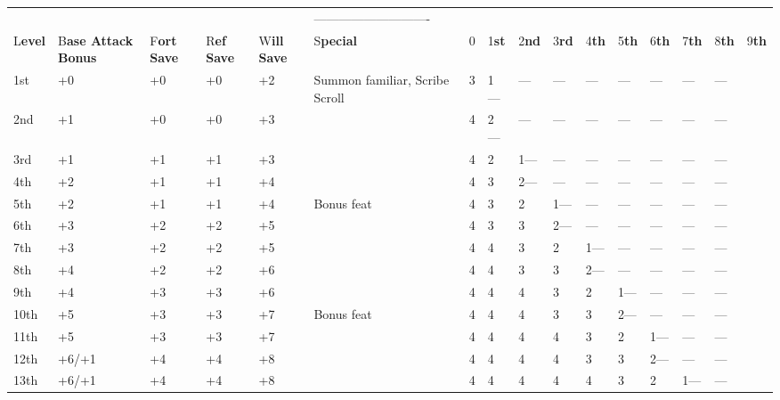 \documentclass{article}
\begin{document}
\vspace{12pt}
\begin{tabular}{|>{\raggedright}p{15pt}|>{\raggedright}p{25pt}|>{\raggedright}p{11pt}|>{\raggedright}p{10pt}|>{\raggedright}p{11pt}|>{\raggedright}p{19pt}|>{\raggedright}p{3pt}|>{\raggedright}p{7pt}|>{\raggedright}p{6pt}|>{\raggedright}p{6pt}|>{\raggedright}p{6pt}|>{\raggedright}p{6pt}|>{\raggedright}p{6pt}|>{\raggedright}p{6pt}|>{\raggedright}p{6pt}|>{\raggedright}p{6pt}|}
\hline
\multicolumn{16}{|p{158pt}|}{T\textbf{able: The Wizard}}\tabularnewline
\hline
 &  &  &  &  & ---------------------------- & \multicolumn{10}{p{64pt}|}{ \textbf{Spells 
per Day -------------------------}}\tabularnewline
\hline
L\textbf{evel} & B\textbf{ase Attack }\linebreak{}
\textbf{Bonus} & F\textbf{ort }\linebreak{}
\textbf{Save} & R\textbf{ef }\linebreak{}
\textbf{Save} & W\textbf{ill }\linebreak{}
\textbf{Save} & S\textbf{pecial} & 0 & 1\textbf{st} & 2\textbf{nd} & 3\textbf{rd} & 4\textbf{th} & 5\textbf{th} & 6\textbf{th} & 7\textbf{th} & 8\textbf{th} & 9\textbf{th}\tabularnewline
\hline
1st & +0 & +0 & +0 & +2 & Summon familiar, \linebreak{}
Scribe Scroll & 3 & 1--- & --- & --- & --- & --- & --- & --- & --- & \tabularnewline
\hline
2nd & +1 & +0 & +0 & +3 &  & 4 & 2--- & --- & --- & --- & --- & --- & --- & --- & \tabularnewline
\hline
3rd & +1 & +1 & +1 & +3 &  & 4 & 2 & 1--- & --- & --- & --- & --- & --- & --- & \tabularnewline
\hline
4th & +2 & +1 & +1 & +4 &  & 4 & 3 & 2--- & --- & --- & --- & --- & --- & --- & \tabularnewline
\hline
5th & +2 & +1 & +1 & +4 & Bonus feat & 4 & 3 & 2 & 1--- & --- & --- & --- & --- & --- & \tabularnewline
\hline
6th & +3 & +2 & +2 & +5 &  & 4 & 3 & 3 & 2--- & --- & --- & --- & --- & --- & \tabularnewline
\hline
7th & +3 & +2 & +2 & +5 &  & 4 & 4 & 3 & 2 & 1--- & --- & --- & --- & --- & \tabularnewline
\hline
8th & +4 & +2 & +2 & +6 &  & 4 & 4 & 3 & 3 & 2--- & --- & --- & --- & --- & \tabularnewline
\hline
9th & +4 & +3 & +3 & +6 &  & 4 & 4 & 4 & 3 & 2 & 1--- & --- & --- & --- & \tabularnewline
\hline
10th & +5 & +3 & +3 & +7 & Bonus feat & 4 & 4 & 4 & 3 & 3 & 2--- & --- & --- & --- & \tabularnewline
\hline
11th & +5 & +3 & +3 & +7 &  & 4 & 4 & 4 & 4 & 3 & 2 & 1--- & --- & --- & \tabularnewline
\hline
12th & +6/+1 & +4 & +4 & +8 &  & 4 & 4 & 4 & 4 & 3 & 3 & 2--- & --- & --- & \tabularnewline
\hline
13th & +6/+1 & +4 & +4 & +8 &  & 4 & 4 & 4 & 4 & 4 & 3 & 2 & 1--- & --- & \tabularnewline

\end{tabular}
\end{document}
